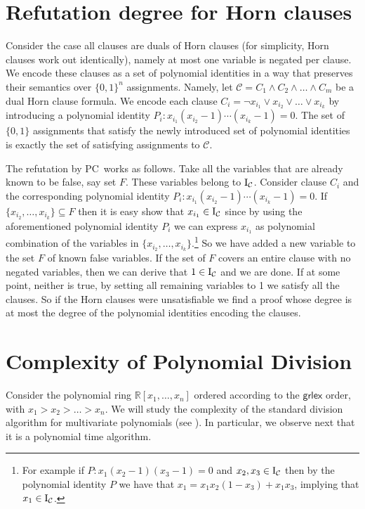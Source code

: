 \documentclass[11pt]{article}
\newcommand{\Cc}{\mathcal{C}}
\newcommand{\PC}{\textsc{PC}}
\newcommand{\grlexns}{\textsf{grlex}}
\newcommand{\I}{\emph{$\rm{I}$}}
\newcommand{\1}{\textbf{1}}
\begin{document}
{
%

}

\newpage

\appendix
\section{Refutation degree for Horn clauses}\label{sect:ref_deg}
Consider the case all clauses are duals of Horn clauses (for simplicity, Horn clauses work out identically), namely at most one variable is negated per clause. 
We encode these clauses as a set of polynomial identities in a way that preserves their semantics over $\{0,1\}^n$ assignments.
Namely, let $\Cc=C_1\wedge C_2 \wedge \ldots \wedge C_m$ be a dual Horn clause formula. We encode each clause $C_i=\neg x_{i_1}\lor x_{i_2}\lor \ldots \lor x_{i_k}$ by introducing a polynomial identity $P_i:x_{i_1}(x_{i_2}-1)\cdots (x_{i_k}-1)=0$. The set of $\{0,1\}$ assignments that satisfy the newly introduced set of polynomial identities is exactly the set of satisfying assignments to $\Cc$.

The refutation by \PC\ works as follows. Take all the variables that are already known to be false, say set $F$. These variables belong to $\I_\Cc$. Consider clause $C_i$ and the corresponding polynomial identity $P_i:x_{i_1}(x_{i_2}-1)\cdots (x_{i_k}-1)=0$. If $\{x_{i_2},\ldots, x_{i_k}\}\subseteq F$ then it is easy show that $x_{i_1}\in \I_\Cc$ since by using the aforementioned polynomial identity $P_i$ we can express $x_{i_1}$ as polynomial combination of the variables in $\{x_{i_2},\ldots, x_{i_k}\}$.\footnote{For example if $P:x_{1}(x_{2}-1)(x_{3}-1)=0$ and $x_2,x_3\in\I_\Cc$ then by the polynomial identity $P$ we have that $x_1=x_{1}x_{2}(1-x_{3})+x_{1}x_{3}$, implying that $x_1\in\I_\Cc$.}
%
So we have added a new variable to the set $F$ of known false variables. If the set of $F$ covers an entire clause with no negated variables, then we can derive that $1\in \I_\Cc$ and we are done. If at some point, neither is true, by setting all remaining variables to 1 we satisfy all the clauses. So if the Horn clauses were unsatisfiable we find a proof whose degree is at most the degree of the polynomial identities encoding the clauses. 

\section{Complexity of Polynomial Division}\label{sect:PC_bit}
Consider the polynomial ring $\mathbb{R}[x_1, \dots, x_n]$ ordered according to the $\grlexns$ order, with $x_1 > x_2 > \dots > x_n$. We will study the complexity of the standard division algorithm for multivariate polynomials (see \cite[Section 2]{Cox}). In particular, we observe next that it is a polynomial time algorithm.
\end{document}
